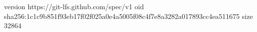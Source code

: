 version https://git-lfs.github.com/spec/v1
oid sha256:1c1c9b851f93eb17f02f025a0e4a5005f08c4f7e8a3282a017893cc4ea511675
size 32864
